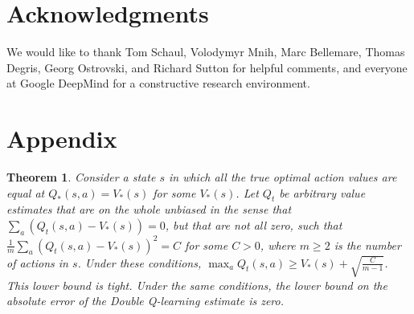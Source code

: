 \documentclass[letterpaper]{article}
\newtheorem{theorem}{Theorem}
\begin{document}
\section*{Acknowledgments}
We would like to thank Tom Schaul, Volodymyr Mnih, Marc Bellemare, Thomas Degris, Georg Ostrovski, and Richard Sutton for helpful comments, and everyone at Google DeepMind for a constructive research environment.
\small


\newpage
\section*{Appendix}
\setcounter{theorem}{0}
\begin{theorem}
Consider a state $s$ in which all the true optimal action values are equal at $Q_*(s,a) = V_*(s)$ for some $V_*(s)$. Let $Q_t$ be arbitrary value estimates that are on the whole unbiased in the sense that $\sum_a ( Q_t(s,a) - V_*(s) ) = 0$, but that are not all zero, such that $\frac{1}{m} \sum_a ( Q_t(s,a) - V_*(s) )^2 = C$ for some $C > 0$, where $m \ge 2$ is the number of actions in $s$. Under these conditions, $\max_a Q_t(s,a) \ge V_*(s) + \sqrt{\frac{C}{m-1}}$.  This lower bound is tight. Under the same conditions, the lower bound on the absolute error of the Double Q-learning estimate is zero.
\end{theorem}
\end{document}
